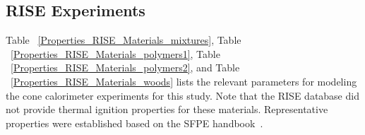 \clearpage






\subsection{RISE Experiments}\label{sec_RISE_Materials}

Table ~\ref{Properties_RISE_Materials_mixtures}, Table ~\ref{Properties_RISE_Materials_polymers1}, Table ~\ref{Properties_RISE_Materials_polymers2}, and Table ~\ref{Properties_RISE_Materials_woods} lists the relevant parameters for modeling the cone calorimeter experiments for this study.
Note that the RISE database did not provide thermal ignition properties for these materials.
Representative properties were established based on the SFPE handbook~\cite{SFPE:Tewarson}.

